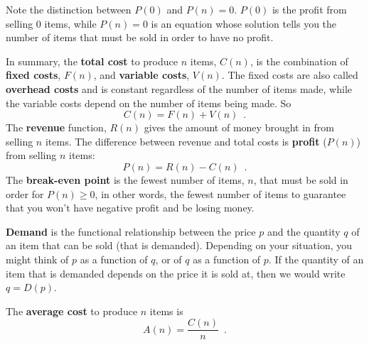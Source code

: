 \begin{remark}
Note the distinction between $P(0)$ and $P(n)=0$. $P(0)$ is the profit from selling 0 items, while $P(n)=0$ is an equation whose solution tells you the number of items that must be sold in order to have no profit.
\end{remark}

\begin{definition}
In summary, the {\bf total cost} to produce $n$ items, $C(n)$, is the combination of {\bf fixed costs}, $F(n)$, and {\bf variable costs}, $V(n)$. The fixed costs are also called {\bf overhead costs} and is constant regardless of the number of items made, while the variable costs depend on the number of items being made. So
$$C(n) = F(n) + V(n)\enspace .$$
The {\bf revenue} function, $R(n)$ gives the amount of money brought in from selling $n$ items. The difference between revenue and total costs is {\bf profit} ($P(n)$) from selling $n$ items:
$$ P(n) = R(n) - C(n)\enspace .$$
The {\bf break-even point} is the fewest number of items, $n$, that must be sold in order for $P(n) \geq 0$, in other words, the fewest number of items to guarantee that you won't have negative profit and be losing money.
\end{definition}
\begin{definition}
{\bf Demand} is the functional relationship between the price $p$ and the quantity $q$ of an item that can be sold (that is demanded). Depending on your situation, you might think of $p$ as a function of $q$, or of $q$ as a function of $p$. If the quantity of an item that is demanded depends on the price it is sold at, then we would write $q = D(p)$.
\end{definition}

\begin{definition}
\label{def:avgcost}
The {\bf average cost} to produce $n$ items is 
$$A(n) = \frac{C(n)}{n} \enspace .$$
\end{definition}

